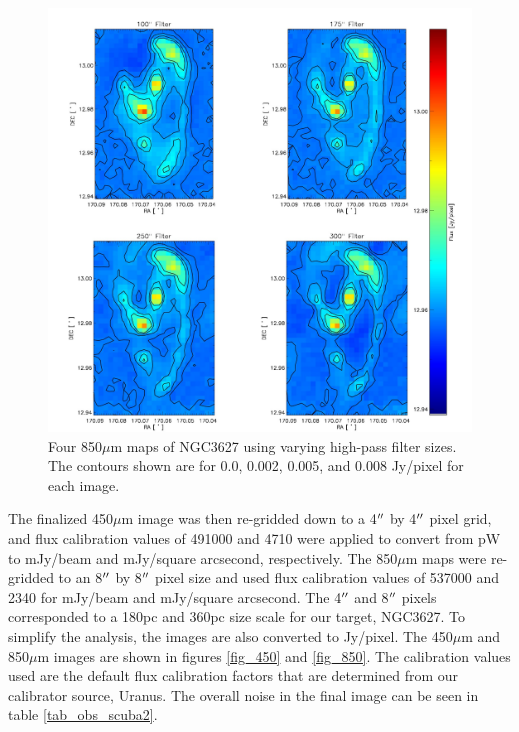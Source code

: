 \begin{figure}
  \centering
  \includegraphics[scale=0.5]{obs_imgs/850_comparison_4.jpeg}
  \caption[850$\mu$m High-Pass Filter Images]{Four 850$\mu$m maps of NGC3627 using varying high-pass filter sizes.  The contours shown are for 0.0, 0.002, 0.005, and 0.008 Jy/pixel for each image.}
    \label{850_flt}
\end{figure}

The finalized 450$\mu$m image was then re-gridded down to a 4$\mbox{$^{\prime\prime}$}$ by 4$\mbox{$^{\prime\prime}$}$ pixel grid, and flux calibration values of 491000 and 4710 were applied to convert from pW to mJy/beam and mJy/square arcsecond, respectively.  The 850$\mu$m maps were re-gridded to an 8$\mbox{$^{\prime\prime}$}$ by 8$\mbox{$^{\prime\prime}$}$ pixel size and used flux calibration values of 537000 and 2340 for mJy/beam and mJy/square arcsecond.  The 4$\mbox{$^{\prime\prime}$}$ and 8$\mbox{$^{\prime\prime}$}$ pixels corresponded to a 180pc and 360pc size scale for our target, NGC3627.  To simplify the analysis, the images are also converted to Jy/pixel.  The 450$\mu$m and 850$\mu$m images are shown in figures \ref{fig_450} and \ref{fig_850}.  The calibration values used are the default flux calibration factors that are determined from our calibrator source, Uranus.  The overall noise in the final image can be seen in table \ref{tab_obs_scuba2}.

